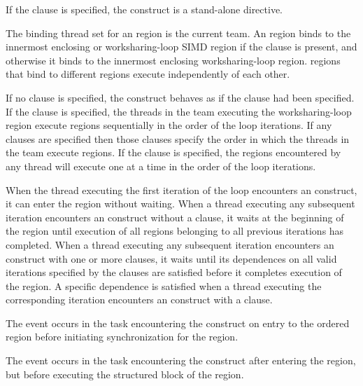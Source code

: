 If the  clause is specified, the  construct is a stand-alone directive.

\binding
The binding thread set for an  region is the current team. An  region
binds to the innermost enclosing  or worksharing-loop SIMD region if the
 clause is present, and otherwise it binds to the innermost
enclosing worksharing-loop region.  regions that bind to different regions
execute independently of each other.

\descr
If no clause is specified, the  construct behaves as if the
 clause had been specified. If the  clause is
specified, the threads in the team executing the worksharing-loop region execute
 regions sequentially in the order of the loop iterations.
If any  clauses are specified then those clauses specify the
order in which the threads in the team execute  regions. If
the  clause is specified, the  regions encountered by
any thread will execute one at a time in the order of the loop iterations.

When the thread executing the first iteration of the loop encounters an
 construct, it can enter the  region without
waiting. When a thread executing any subsequent iteration encounters an
 construct without a  clause, it waits at the
beginning of the  region until execution of all 
regions belonging to all previous iterations has completed. When a thread
executing any subsequent iteration encounters an  construct with
one or more {} clauses, it waits until its dependences on
all valid iterations specified by the  clauses
are satisfied before it completes execution of the  region.
A specific dependence is satisfied when a thread executing the corresponding
iteration encounters an  construct with a  clause.

\events
The  event occurs in the task encountering the
 construct on entry to the ordered region before
initiating synchronization for the region.

The  event occurs in the task encountering the
 construct after entering the region, but before executing the
structured block of the  region.

